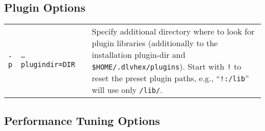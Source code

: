 \documentclass[a4paper, titlepage]{article}
\begin{document}
\subsection{Plugin Options}
\begin{longtable}{ p{2.0em} p{2.2cm} p{0.6cm} p{8.0cm} } 
 \texttt{-p}&\texttt{--plugindir=DIR}&&Specify additional directory where to look for plugin libraries (additionally to the installation plugin-dir and \texttt{\$HOME/.dlvhex/plugins}). Start with \texttt{!} to reset the preset plugin paths, e.g., ``\texttt{!:/lib}'' will use only \texttt{/lib/}.
 \\
\end{longtable}

\subsection{Performance Tuning Options}
\end{document}
